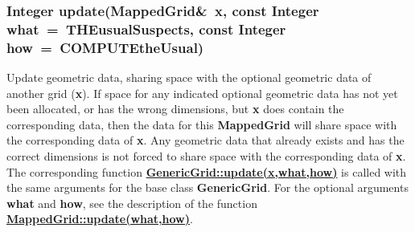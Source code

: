 \documentclass{article}
\begin{document}
  \subsubsection{Integer update(MappedGrid\&~x, const Integer what~=~THEusualSuspects, const Integer how~=~COMPUTEtheUsual)}
  \label{MappedGrid::update(x,what,how)}
    Update geometric data, sharing space with the optional geometric data of another grid (\textbf{x}).
    If space for any indicated optional geometric data has not yet been allocated, or has
    the wrong dimensions, but \textbf{x} does contain the corresponding data, then the data
    for this \textbf{MappedGrid} will share space with the corresponding data of \textbf{x}.
    Any geometric data that already exists and has the correct dimensions
    is not forced to share space with the corresponding data of \textbf{x}.
    The corresponding function
    {\bf{}\hyperref{update(x,what,how)}{update(x,what,how) \rm(\S}{)}{GenericGrid::update(x,what,how)}}
    is called with the same arguments for the base class \textbf{GenericGrid}.
    For the optional arguments \textbf{what} and \textbf{how}, see the description of the function
    {\bf{}\hyperref{update(what,how)}{update(what,how) \rm(\S}{)}{MappedGrid::update(what,how)}}.
\end{document}
